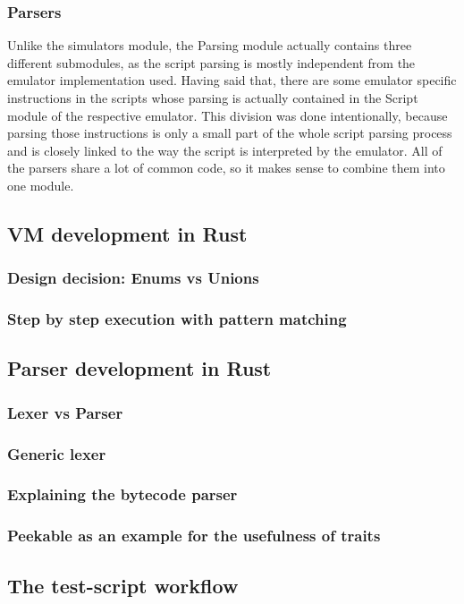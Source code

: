 \subsubsection{Parsers}
Unlike the simulators module, the Parsing module actually contains three different submodules, as the script parsing is mostly independent from the emulator implementation used.
Having said that, there are some emulator specific instructions in the scripts whose parsing is actually contained in the Script module of the respective emulator. This division was done intentionally, because parsing those instructions is only a small part of the whole script parsing process and is closely linked to the way the script is interpreted by the emulator.
All of the parsers share a lot of common code, so it makes sense to combine them into one module.

\subsection{VM development in Rust} \label{rust-vm-dev}
\subsubsection{Design decision: Enums vs Unions}
\subsubsection{Step by step execution with pattern matching}
\subsection{Parser development in Rust}
\subsubsection{Lexer vs Parser}
\subsubsection{Generic lexer}
\subsubsection{Explaining the bytecode parser}
\subsubsection{Peekable as an example for the usefulness of traits}
\subsection{The test-script workflow}
